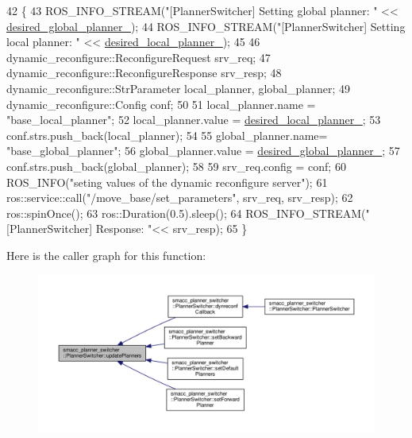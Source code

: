 \begin{DoxyCode}
42 \{
43   ROS\_INFO\_STREAM(\textcolor{stringliteral}{"[PlannerSwitcher] Setting global planner: "} << 
      \hyperlink{classsmacc__planner__switcher_1_1PlannerSwitcher_aed229df648a0903e3cdf77682220efb5}{desired\_global\_planner\_});
44   ROS\_INFO\_STREAM(\textcolor{stringliteral}{"[PlannerSwitcher] Setting local planner: "} << 
      \hyperlink{classsmacc__planner__switcher_1_1PlannerSwitcher_aecc5958653ed39dd7611783043d23345}{desired\_local\_planner\_});
45 
46   dynamic\_reconfigure::ReconfigureRequest srv\_req;
47   dynamic\_reconfigure::ReconfigureResponse srv\_resp;
48   dynamic\_reconfigure::StrParameter local\_planner, global\_planner;
49   dynamic\_reconfigure::Config conf;
50 
51   local\_planner.name = \textcolor{stringliteral}{"base\_local\_planner"};
52   local\_planner.value =  \hyperlink{classsmacc__planner__switcher_1_1PlannerSwitcher_aecc5958653ed39dd7611783043d23345}{desired\_local\_planner\_};
53   conf.strs.push\_back(local\_planner);
54 
55   global\_planner.name= \textcolor{stringliteral}{"base\_global\_planner"};
56   global\_planner.value = \hyperlink{classsmacc__planner__switcher_1_1PlannerSwitcher_aed229df648a0903e3cdf77682220efb5}{desired\_global\_planner\_};
57   conf.strs.push\_back(global\_planner);
58   
59   srv\_req.config = conf;
60   ROS\_INFO(\textcolor{stringliteral}{"seting values of the dynamic reconfigure server"});
61   ros::service::call(\textcolor{stringliteral}{"/move\_base/set\_parameters"}, srv\_req, srv\_resp);
62   ros::spinOnce();
63   ros::Duration(0.5).sleep();
64   ROS\_INFO\_STREAM(\textcolor{stringliteral}{"[PlannerSwitcher] Response: "}<< srv\_resp);
65 \}
\end{DoxyCode}


Here is the caller graph for this function\+:
\nopagebreak
\begin{figure}[H]
\begin{center}
\leavevmode
\includegraphics[width=350pt]{classsmacc__planner__switcher_1_1PlannerSwitcher_ae45c57b459f1eb9ee4cc3c6dc6dc0995_icgraph}
\end{center}
\end{figure}




